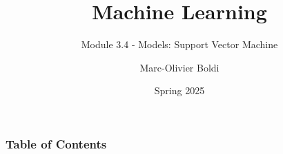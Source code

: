 
\title{Machine Learning}
\subtitle{Module 3.4 - Models: Support Vector Machine}
\author[MOB]{Marc-Olivier Boldi}
\date{Spring 2025}

\begin{frame}
  \titlepage
\end{frame}
\begin{frame}
\frametitle{Table of Contents}
	\tableofcontents
\end{frame}
